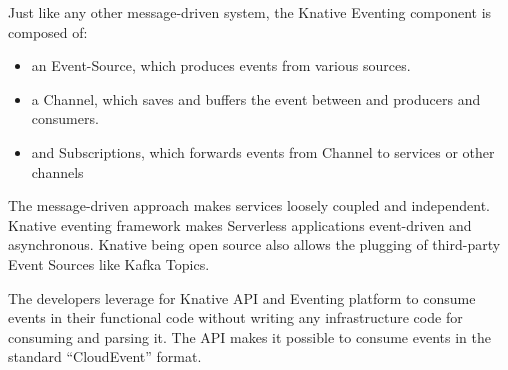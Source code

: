\documentclass[12pt]{article}
\begin{document}
\begin{flushleft}
Just like any other message-driven system, the Knative Eventing component is composed of:
\begin{itemize}
    \item an Event-Source, which produces events from various sources.
    \item a Channel, which saves and buffers the event between and producers and consumers.
    \item 	and Subscriptions, which forwards events from Channel to services or other channels
\end{itemize}

The message-driven approach makes services loosely coupled and independent. Knative eventing framework makes Serverless applications event-driven and asynchronous. Knative being open source also allows the plugging of third-party Event Sources like Kafka Topics. 

The developers leverage for Knative API and Eventing platform to consume events in their functional code without writing any infrastructure code for consuming and parsing it. The API makes it possible to consume events in the standard “CloudEvent” format. 
\end{flushleft}
\end{document}
